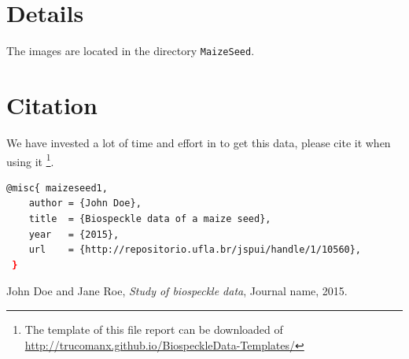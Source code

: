 \documentclass[a4paper,10pt]{article}
\begin{document}
\section*{Details}
The images are located in the directory \lstinline!MaizeSeed!.

\section*{Citation}
We have invested a lot of time and effort in to get this data, please cite it
when using it \footnote{The template of this file report can be downloaded of 
\url{http://trucomanx.github.io/BiospeckleData-Templates/}}.
\begin{lstlisting}[language=Bash]
@misc{ maizeseed1,
    author = {John Doe},
    title  = {Biospeckle data of a maize seed},
    year   = {2015},
    url    = {http://repositorio.ufla.br/jspui/handle/1/10560},
 }
\end{lstlisting}


\begin{thebibliography}{9}
John Doe and Jane Roe,
\emph{Study of biospeckle data},
Journal name, 2015.

\end{thebibliography}
\end{document}
